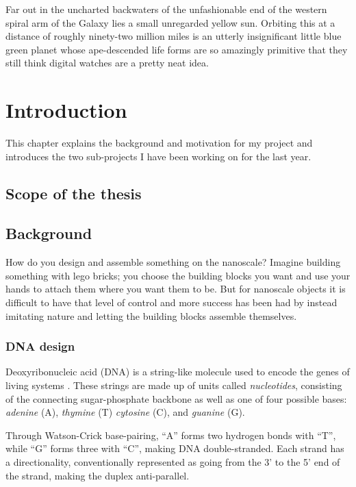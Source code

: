\begin{savequote}[8cm]
Far out in the uncharted backwaters of the unfashionable end of the western spiral arm of the Galaxy lies a small unregarded yellow sun. Orbiting this at a distance of roughly ninety-two million miles is an utterly insignificant little blue green planet whose ape-descended life forms are so amazingly primitive that they still think digital watches are a pretty neat idea.
\end{savequote}

\chapter{Introduction}\label{ch:1-intro}

\minitoc

This chapter explains the background and motivation for my project and introduces the two sub-projects I have been working on for the last year.


\section{Scope of the thesis}

\section{Background}
How do you design and assemble something on the nanoscale? Imagine building something with lego bricks; you choose the building blocks you want and use your hands to attach them where you want them to be. But for nanoscale objects it is difficult to have that level of control and more success has been had by instead imitating nature and letting the building blocks assemble themselves.

\subsection{DNA design}
Deoxyribonucleic acid (DNA) is a string-like molecule used to encode the genes of living systems \cite{calladine1997understanding}. These strings are made up of units called \emph{nucleotides}, consisting of the connecting sugar-phosphate backbone as well as one of four possible bases: \emph{adenine} (A), \emph{thymine} (T) \emph{cytosine} (C), and \emph{guanine} (G).

Through Watson-Crick base-pairing, ``A'' forms two hydrogen bonds with ``T'', while ``G'' forms three with ``C'', making DNA double-stranded. Each strand has a directionality, conventionally represented as going from the 3' to the 5' end of the strand, making the duplex anti-parallel.

